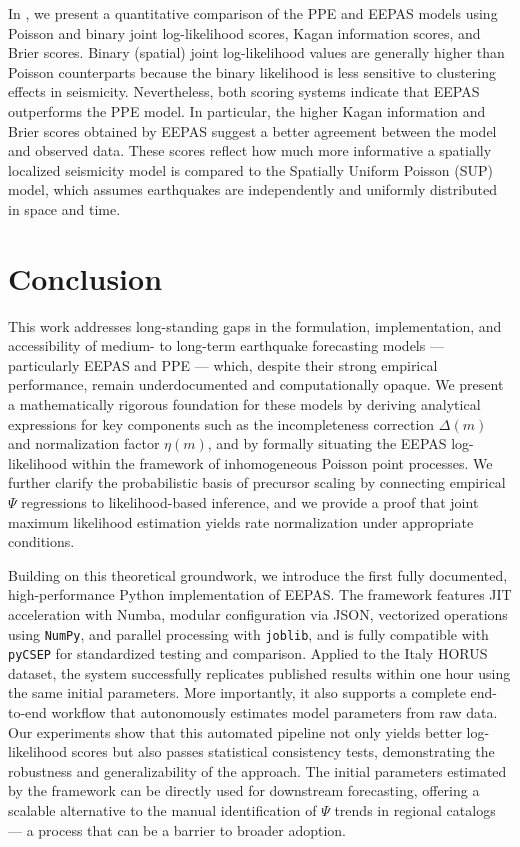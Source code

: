 \documentclass[extra,mreferee]{gji}
\theoremstyle{lemma}
\begin{document}
In , we present a quantitative comparison of the PPE and EEPAS models using Poisson and binary joint log-likelihood scores, Kagan information scores, and Brier scores. Binary (spatial) joint log-likelihood values are generally higher than Poisson counterparts because the binary likelihood is less sensitive to clustering effects in seismicity. Nevertheless, both scoring systems indicate that EEPAS outperforms the PPE model. In particular, the higher Kagan information and Brier scores obtained by EEPAS suggest a better agreement between the model and observed data. These scores reflect how much more informative a spatially localized seismicity model is compared to the Spatially Uniform Poisson (SUP) model, which assumes earthquakes are independently and uniformly distributed in space and time.


\section{Conclusion}
This work addresses long-standing gaps in the formulation, implementation, and accessibility of medium- to long-term earthquake forecasting models — particularly EEPAS and PPE — which, despite their strong empirical performance, remain underdocumented and computationally opaque. We present a mathematically rigorous foundation for these models by deriving analytical expressions for key components such as the incompleteness correction $\Delta(m)$ and normalization factor $\eta(m)$, and by formally situating the EEPAS log-likelihood within the framework of inhomogeneous Poisson point processes. We further clarify the probabilistic basis of precursor scaling by connecting empirical $\Psi$ regressions to likelihood-based inference, and we provide a proof that joint maximum likelihood estimation yields rate normalization under appropriate conditions.

Building on this theoretical groundwork, we introduce the first fully documented, high-performance Python implementation of EEPAS. The framework features JIT acceleration with Numba, modular configuration via JSON, vectorized operations using \texttt{NumPy}, and parallel processing with \texttt{joblib}, and is fully compatible with \texttt{pyCSEP} for standardized testing and comparison. Applied to the Italy HORUS dataset, the system successfully replicates published results within one hour using the same initial parameters. More importantly, it also supports a complete end-to-end workflow that autonomously estimates model parameters from raw data. Our experiments show that this automated pipeline not only yields better log-likelihood scores but also passes statistical consistency tests, demonstrating the robustness and generalizability of the approach. The initial parameters estimated by the framework can be directly used for downstream forecasting, offering a scalable alternative to the manual identification of $\Psi$ trends in regional catalogs — a process that can be a barrier to broader adoption.
\end{document}
